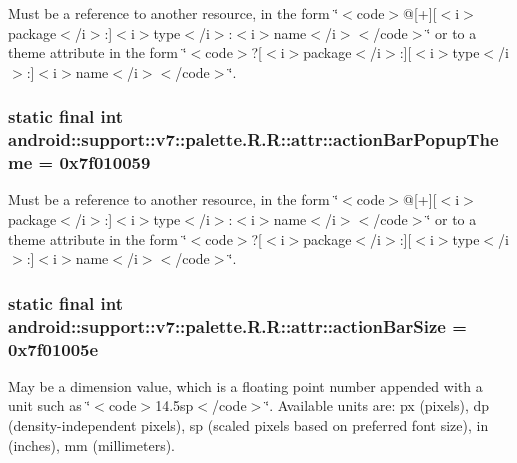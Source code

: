 Must be a reference to another resource, in the form \char`\"{}$<$code$>$@\mbox{[}+\mbox{]}\mbox{[}$<$i$>$package$<$/i$>$:\mbox{]}$<$i$>$type$<$/i$>$:$<$i$>$name$<$/i$>$$<$/code$>$\char`\"{} or to a theme attribute in the form \char`\"{}$<$code$>$?\mbox{[}$<$i$>$package$<$/i$>$:\mbox{]}\mbox{[}$<$i$>$type$<$/i$>$:\mbox{]}$<$i$>$name$<$/i$>$$<$/code$>$\char`\"{}. \hypertarget{classandroid_1_1support_1_1v7_1_1palette_1_1_r_1_1attr_49aca1cd9c47887a94ad880475a85a20}{
\subsubsection[{actionBarPopupTheme}]{\setlength{\rightskip}{0pt plus 5cm}static final int android::support::v7::palette.R.R::attr::actionBarPopupTheme = 0x7f010059}}
\label{classandroid_1_1support_1_1v7_1_1palette_1_1_r_1_1attr_49aca1cd9c47887a94ad880475a85a20}


Must be a reference to another resource, in the form \char`\"{}$<$code$>$@\mbox{[}+\mbox{]}\mbox{[}$<$i$>$package$<$/i$>$:\mbox{]}$<$i$>$type$<$/i$>$:$<$i$>$name$<$/i$>$$<$/code$>$\char`\"{} or to a theme attribute in the form \char`\"{}$<$code$>$?\mbox{[}$<$i$>$package$<$/i$>$:\mbox{]}\mbox{[}$<$i$>$type$<$/i$>$:\mbox{]}$<$i$>$name$<$/i$>$$<$/code$>$\char`\"{}. \hypertarget{classandroid_1_1support_1_1v7_1_1palette_1_1_r_1_1attr_f9dd00dc96ac7ed024ef6d244a0e1d8d}{
\subsubsection[{actionBarSize}]{\setlength{\rightskip}{0pt plus 5cm}static final int android::support::v7::palette.R.R::attr::actionBarSize = 0x7f01005e}}
\label{classandroid_1_1support_1_1v7_1_1palette_1_1_r_1_1attr_f9dd00dc96ac7ed024ef6d244a0e1d8d}


May be a dimension value, which is a floating point number appended with a unit such as \char`\"{}$<$code$>$14.5sp$<$/code$>$\char`\"{}. Available units are: px (pixels), dp (density-independent pixels), sp (scaled pixels based on preferred font size), in (inches), mm (millimeters). 

